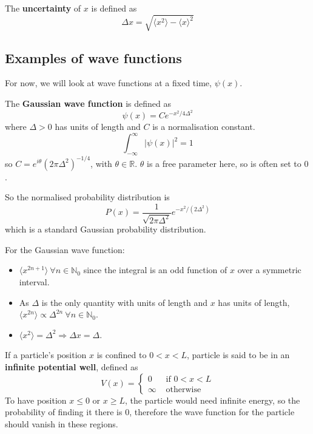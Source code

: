 \begin{definition}
	The \textbf{uncertainty} of $x$ is defined as
	\[
		\Delta x = \sqrt{\langle x^2 \rangle - \langle x \rangle ^2}
	\]
\end{definition}

\subsection{Examples of wave functions}

\begin{remark}
	For now, we will look at wave functions at a fixed time, $\psi(x)$.
\end{remark}

\begin{definition}
	The \textbf{Gaussian wave function} is defined as
	\[
		\psi(x) = C e^{-x^2 / 4 \Delta^2}
	\]
	where $\Delta > 0$ has units of length and $C$ is a normalisation constant.
	\[
		\int_{-\infty}^{\infty} |\psi(x)|^2 = 1
	\]
	so $C = e^{i \theta} {(2 \pi \Delta^2)}^{-1/4}$, with $\theta \in \mathbb{R}$. $\theta$ is a free parameter here, so is often set to $0$.

	So the normalised probability distribution is
	\[
		P(x) = \frac{1}{\sqrt{2 \pi \Delta^2}} e^{-x^2 / (2 \Delta^2)}
	\]
	which is a standard Gaussian probability distribution.
\end{definition}

\begin{remark}
	For the Gaussian wave function:
	\begin{itemize}
		\item $\langle x^{2n + 1} \rangle \ \forall n \in \mathbb{N}_0$ since the integral is an odd function of $x$ over a symmetric interval.
		\item As $\Delta$ is the only quantity with units of length and $x$ has units of length, $\langle x^{2n} \rangle \propto \Delta^{2n} \ \forall n \in \mathbb{N}_0$.
		\item $\langle x^2 \rangle = \Delta^2 \Longrightarrow \Delta x = \Delta$.
	\end{itemize}
\end{remark}

\begin{definition}
	If a particle's position $x$ is confined to $0 < x < L$, particle is said to be in an \textbf{infinite potential well}, defined as
	\[
		V(x) = \begin{cases}
			0 & \text{ if } 0 < x < L \\
			\infty & \text{ otherwise}
		\end{cases}
	\]
	To have position $x \le 0$ or $x \ge L$, the particle would need infinite energy, so the probability of finding it there is $0$, therefore the wave function for the particle should vanish in these regions.
\end{definition}

